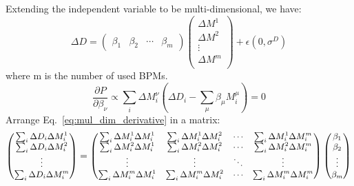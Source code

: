 Extending the independent variable to be multi-dimensional, we have:
\begin{equation}
    \Delta D = \begin{pmatrix} \beta_1 & \beta_2 & \cdots & \beta_m \end{pmatrix} 
	\begin{pmatrix}
	    \Delta M^1	\\
	    \Delta M^2	\\
	    \vdots 	\\
	    \Delta M^m	\\
	\end{pmatrix}
	+ \epsilon(0, \sigma^D)
\end{equation}
where m is the number of used BPMs.
\begin{equation}
    \frac{\partial P}{\partial \beta_\nu} \propto \sum_i \Delta M_i^\nu (\Delta D_i - \sum_\mu \beta_\mu M_i^\mu) = 0
    \label{eq:mul_dim_derivative}
\end{equation}
Arrange Eq.~\ref{eq:mul_dim_derivative} in a matrix:
\begin{equation}
    \small
    \begin{pmatrix}
	\sum_i \Delta D_i \Delta M_i^1 \\
	\sum_i \Delta D_i \Delta M_i^2 \\
	\vdots	\\
	\sum_i \Delta D_i \Delta M_i^m \\
    \end{pmatrix}
    = 
    \begin{pmatrix}
	\sum_i \Delta M_i^1 \Delta M_i^1    & \sum_i \Delta M_i^1 \Delta M_i^2	&
	\cdots	& \sum_i \Delta M_i^1 \Delta M_i^m  \\
	\sum_i \Delta M_i^2 \Delta M_i^1    & \sum_i \Delta M_i^2 \Delta M_i^2	&
	\cdots	& \sum_i \Delta M_i^2 \Delta M_i^m  \\
	\vdots	& \vdots    & \ddots	& \vdots    \\
	\sum_i \Delta M_i^m \Delta M_i^1    & \sum_i \Delta M_i^m \Delta M_i^2	&
	\cdots	& \sum_i \Delta M_i^m \Delta M_i^m  \\
    \end{pmatrix}
    \begin{pmatrix}
	\beta_1 \\
	\beta_2 \\
	\vdots	\\
	\beta_m \\ 
    \end{pmatrix}
\end{equation}

